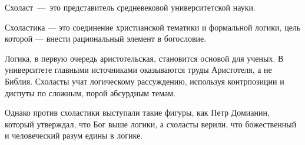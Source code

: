 Схоласт~---~это представитель средневековой университетской науки.

Схоластика --- это соединение христианской тематики и формальной логики, цель которой --- внести рациональный элемент в богословие. 

Логика, в первую очередь аристотельская, становится основой для ученых. В университете главными источниками оказываются труды Аристотеля, а не Библия. Схоласты учат логическому рассуждению, используя контрпозиции и диспуты по сложным, порой абсурдным темам. 

Однако против схоластики выступали такие фигуры, как Петр Домианин, который утверждал, что Бог выше логики, а схоласты верили, что божественный и человеческий разум едины в логике.



